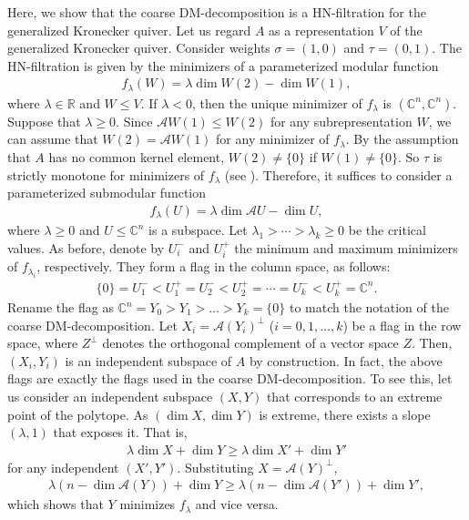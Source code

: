 \documentclass[a4paper,11pt]{article}
\numberwithin{equation}{section}
\newcommand{\C}{\mathbb{C}}
\newcommand{\R}{\mathbb{R}}
\newcommand{\caA}{\mathcal{A}}
\begin{document}
Here, we show that the coarse DM-decomposition is a HN-filtration for the generalized Kronecker quiver.
Let us regard $A$ as a representation $V$ of the generalized Kronecker quiver.
Consider weights $\sigma = (1,0)$ and $\tau = (0,1)$. 
The HN-filtration is given by the minimizers of a parameterized modular function
\begin{align}
    f_\lambda(W) = \lambda \dim W(2) - \dim W(1),
\end{align}
where $\lambda \in \R$ and $W \leq V$.
If $\lambda < 0$,
then the unique minimizer of $f_\lambda$ is $(\C^n, \C^n)$.
Suppose that $\lambda \geq 0$.
Since $\caA W(1) \leq W(2)$ for any subrepresentation $W$, we can assume that $W(2) = \caA W(1)$ for any minimizer of $f_\lambda$.
By the assumption that $A$ has no common kernel element, $W(2) \neq \{0\}$ if $W(1) \neq \{0\}$.
So $\tau$ is strictly monotone for minimizers of $f_\lambda$ (see ).
Therefore, it suffices to consider a parameterized submodular function
\begin{align}
    f_\lambda(U) = \lambda \dim \caA U - \dim U,
\end{align}
where $\lambda \geq 0$ and $U \leq \C^n$ is a subspace.
Let $\lambda_1 > \cdots > \lambda_k \geq 0$ be the critical values.
As before, denote by $U_i^-$ and $U_i^+$ the minimum and maximum minimizers of $f_{\lambda_i}$, respectively.
They form a flag in the column space, as follows:
\begin{align}
    \{0\} = U_1^- < U_1^+ = U_2^- < U_2^+ = \cdots = U_k^- < U_k^+ = \C^n.
\end{align}
Rename the flag as $\C^n = Y_0 > Y_1 > \dots > Y_k = \{0\}$ to match the notation of the coarse DM-decomposition.
Let $X_i = \caA(Y_i)^\perp$ ($i = 0, 1, \dots, k$) be a flag in the row space,
where $Z^\perp$ denotes the orthogonal complement of a vector space $Z$.
Then, $(X_i, Y_i)$ is an independent subspace of $A$ by construction.
In fact, the above flags are exactly the flags used in the coarse DM-decomposition.
To see this, let us consider an independent subspace $(X, Y)$ that corresponds to an extreme point of the polytope.
As $(\dim X, \dim Y)$ is extreme, there exists a slope $(\lambda, 1)$ that exposes it.
That is, 
\begin{align}
    \lambda \dim X + \dim Y \geq \lambda \dim X' + \dim Y'
\end{align}
for any independent $(X', Y')$.
Substituting $X = \caA(Y)^\perp$, 
\begin{align}
    \lambda (n - \dim \caA(Y)) + \dim Y \geq \lambda (n - \dim \caA(Y')) + \dim Y',
\end{align}
which shows that $Y$ minimizes $f_\lambda$ and vice versa.
\end{document}
